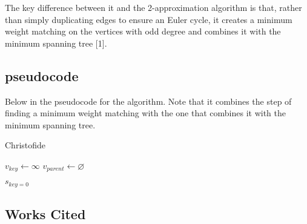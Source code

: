 \documentclass{article}
\begin{document}
The key difference between it and the 2-approximation
algorithm is that, rather than simply duplicating edges to ensure an Euler
cycle, it creates a minimum weight matching on the vertices with odd degree and
combines it with the minimum spanning tree [1].

\subsection{pseudocode}
Below in the pseudocode for the algorithm. Note that it combines the step of
finding a minimum weight matching with the one that combines it with the minimum
spanning tree.

\begin{algorithm}
  \caption{Christofide}
  \label{alg1}
  \begin{algorithmic}[1]

      \State $v_{\textit{key}} \gets \infty$
      \State $v_{\textit{parent}} \gets \varnothing$
    \EndFor

    \State $s_{\textit{key} = 0}$


    \EndWhile

    \EndProcedure
  \end{algorithmic}
\end{algorithm}

\subsection{Works Cited}
\end{document}
